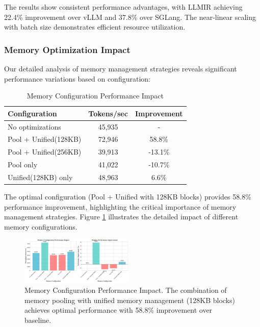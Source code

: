 \documentclass[conference]{IEEEtran}
\begin{document}
The results show consistent performance advantages, with LLMIR achieving 22.4\% improvement over vLLM and 37.8\% over SGLang. The near-linear scaling with batch size demonstrates efficient resource utilization.

\subsubsection{Memory Optimization Impact}

Our detailed analysis of memory management strategies reveals significant performance variations based on configuration:

\begin{table}[htbp]
\caption{Memory Configuration Performance Impact}
\begin{center}
\begin{tabular}{|l|c|c|}
\hline
\textbf{Configuration} & \textbf{Tokens/sec} & \textbf{Improvement} \\
\hline
No optimizations & 45,935 & - \\
\hline
Pool + Unified(128KB) & 72,946 & 58.8\% \\
\hline
Pool + Unified(256KB) & 39,913 & -13.1\% \\
\hline
Pool only & 41,022 & -10.7\% \\
\hline
Unified(128KB) only & 48,963 & 6.6\% \\
\hline
\end{tabular}
\label{tab:memory}
\end{center}
\end{table}

The optimal configuration (Pool + Unified with 128KB blocks) provides 58.8\% performance improvement, highlighting the critical importance of memory management strategies. Figure \ref{fig:memory} illustrates the detailed impact of different memory configurations.

\begin{figure}[htbp]
\centering
\includegraphics[width=0.48\textwidth]{figures/memory_optimization_impact.pdf}
\caption{Memory Configuration Performance Impact. The combination of memory pooling with unified memory management (128KB blocks) achieves optimal performance with 58.8\% improvement over baseline.}
\label{fig:memory}
\end{figure}
\end{document}
